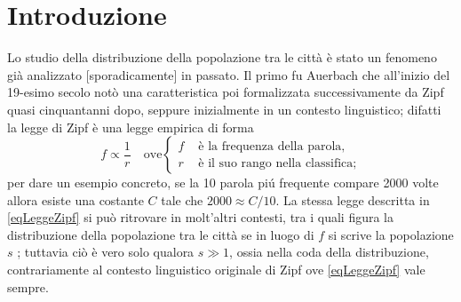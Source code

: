 

\chapter{Introduzione}\label{secIntroduzione}

    Lo studio della distribuzione della popolazione tra le città è stato un fenomeno già analizzato [sporadicamente] in passato. Il primo fu Auerbach \cite{Auerbach1913} che all'inizio del 19-esimo secolo notò una caratteristica poi formalizzata successivamente da Zipf\footnotemark{} \cite{Zipf2016} quasi cinquantanni dopo, seppure inizialmente in un contesto linguistico; difatti la legge di Zipf è una legge empirica di forma
    \begin{equation}
        \label{eqLeggeZipf}
        f\propto\frac1 r\quad\text{ove}
        \left\{\begin{aligned}
            f&\text{ è la frequenza della parola,}\\
            r&\text{ è il suo rango nella classifica;}
        \end{aligned}\right.
    \end{equation}
    per dare un esempio concreto, se la 10 parola piú frequente compare 2000 volte allora esiste una costante \(C\) tale che \(2000\approx C/10\). La stessa legge descritta in \eqref{eqLeggeZipf} si può ritrovare in molt'altri contesti, tra i quali figura la distribuzione della popolazione tra le città se in luogo di \(f\) si scrive la popolazione \(s\) \cite[Fig. 9-2, p. 375]{Zipf2016}; tuttavia ciò è vero solo qualora \(s\gg1\), ossia nella coda della distribuzione, contrariamente al contesto linguistico originale di Zipf ove \eqref{eqLeggeZipf} vale sempre.
  

